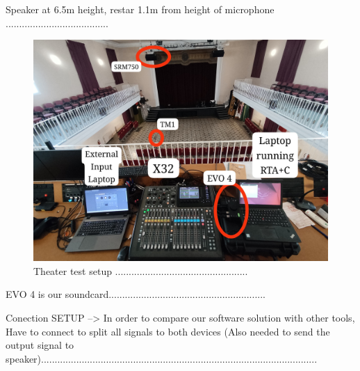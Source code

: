 Speaker at 6.5m height, restar 1.1m from height of microphone ......................................

\begin{figure}[H]
	\centering
	\includegraphics[width=1
	\linewidth]{Figures/Coro_setup.jpeg}
	\caption{Theater test setup .................................................}
	\label{fig:Coro_setup}
\end{figure}

EVO 4 is our soundcard..........................................................

Conection SETUP --> In order to compare our software solution with other tools, Have to connect to split all signals to both devices (Also needed to send the output signal to speaker)......................................................................................................

